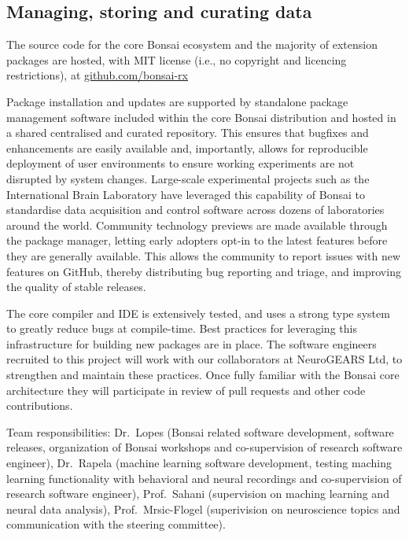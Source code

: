 \documentclass[a4paper,11pt]{article}
\begin{document}
\subsection{Managing, storing and curating data}

The source code for the core Bonsai ecosystem and the majority of extension
packages are hosted, with MIT license (i.e., no copyright and licencing
restrictions), at \url{github.com/bonsai-rx} 

Package installation and updates are supported by standalone package management
software included within the core Bonsai distribution and hosted in a shared
centralised and curated repository. This ensures that bugfixes and enhancements
are easily available and, importantly, allows for reproducible deployment of
user environments to ensure working experiments are not disrupted by system
changes.
%
Large-scale experimental projects such as the International Brain Laboratory
have leveraged this capability of Bonsai to standardise data acquisition and
control software across dozens of laboratories around the world.
%
Community technology previews are made available through the package manager,
letting early adopters opt-in to the latest features before they are generally
available. This allows the community to report issues with new features on
GitHub, thereby distributing bug reporting and triage, and improving the
quality of stable releases.

The core compiler and IDE is extensively tested, and uses a strong type system
to greatly reduce bugs at compile-time. Best practices for leveraging this
infrastructure for building new packages are in place. The software engineers
recruited to this project will work with our collaborators at NeuroGEARS Ltd,
to strengthen and maintain these practices. Once fully familiar with the Bonsai
core architecture they will participate in review of pull requests and other
code contributions.

Team responsibilities: Dr.~Lopes (Bonsai related software development, software
releases, organization of Bonsai workshops and co-supervision of research
software engineer), Dr.~Rapela (machine learning software development, testing
maching learning functionality with behavioral and neural recordings and
co-supervision of research software engineer), Prof.~Sahani (supervision on
maching learning and neural data analysis), Prof.~Mrsic-Flogel (superivision on
neuroscience topics and communication with the steering committee).
\end{document}
